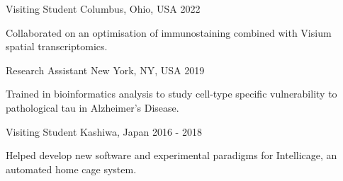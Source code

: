 %
%
%

\vspace*{0.35cm}

\begin{cventries}

    {Visiting Student}
    {Columbus, Ohio, USA}
    {2022}
    {\begin{cvitems}
        \item Collaborated on an optimisation of immunostaining combined with Visium spatial transcriptomics.
    \end{cvitems}\vspace{1.5\baselineskip}}

    \vspace*{0.2cm}

    {Research Assistant}
    {New York, NY, USA}
    {2019}
    {\begin{cvitems}
        \item Trained in bioinformatics analysis to study cell-type specific vulnerability to pathological tau in Alzheimer's Disease.
    \end{cvitems}\vspace{1.5\baselineskip}}

    \vspace*{0.2cm}

    {Visiting Student}
    {Kashiwa, Japan}
    {2016 - 2018}
    {\begin{cvitems}
        \item Helped develop new software and experimental paradigms for Intellicage, an automated home cage system.
    \end{cvitems}\vspace{1.5\baselineskip}}


\end{cventries}

